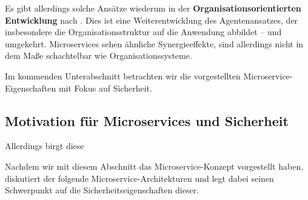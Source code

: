 Es gibt allerdings solche Ansätze wiederum in der \textbf{Organisationsorientierten Entwicklung} nach \cite{Wester-Ebbinghaus10}. Dies ist eine Weiterentwicklung des Agentenansatzes, der insbesondere die Organisationsstruktur auf die Anwendung abbildet – und umgekehrt. Microservices sehen ähnliche Synergieeffekte, sind allerdings nicht in dem Maße schachtelbar wie Organisationssysteme.

Im kommenden Unterabschnitt betrachten wir die vorgestellten Microservice-Eigenschaften mit Fokus auf Sicherheit.

\subsection{Motivation für Microservices und Sicherheit}
\label{subsec:motivation}

Allerdings birgt diese 

Nachdem wir mit diesem Abschnitt das Microservice-Konzept vorgestellt haben, diskutiert der folgende Microservice-Architekturen und legt dabei seinen Schwerpunkt auf die Sicherheitseigenschaften dieser.
